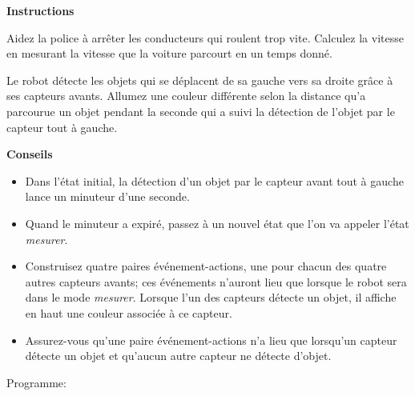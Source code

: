 \label{ch.radar}

\textbf{Instructions}

Aidez la police à arrêter les conducteurs qui roulent trop vite.
Calculez la vitesse en mesurant la vitesse que la voiture parcourt en un temps donné.

Le robot détecte les objets qui se déplacent de sa gauche vers sa droite grâce à ses capteurs
avants.
Allumez une couleur différente selon la distance qu'a parcourue un objet pendant la seconde
qui a suivi la détection de l'objet par le capteur tout à gauche.

\textbf{Conseils}

\begin{itemize}

\item Dans l'état initial, la détection d'un objet par le capteur avant tout à gauche lance un
    minuteur d'une seconde.

\item Quand le minuteur a expiré, passez à un nouvel état que l'on va appeler l'état \emph{mesurer}.

\item Construisez quatre paires événement-actions, une pour chacun des quatre autres capteurs avants;
    ces événements n'auront lieu que lorsque le robot sera dans le mode \emph{mesurer}.
    Lorsque l'un des capteurs détecte un objet, il affiche en haut une couleur associée à ce capteur.

\item Assurez-vous qu'une paire événement-actions n'a lieu que lorsqu'un capteur détecte un objet
    et qu'aucun autre capteur ne détecte d'objet.

\end{itemize}

\bigskip

{\raggedleft \hfill Programme: }
